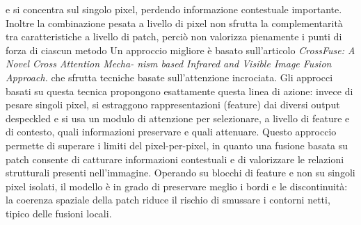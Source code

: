 e si concentra sul singolo pixel, perdendo informazione contestuale importante. 
Inoltre la combinazione pesata a livello di pixel non sfrutta la complementarità tra caratteristiche a livello di 
patch, perciò non valorizza pienamente i punti di forza di ciascun metodo
Un approccio migliore è basato sull'articolo 
\textit{CrossFuse: A Novel Cross Attention Mecha-
nism based Infrared and Visible Image Fusion Approach.} \cite{li2024crossfuse} che sfrutta tecniche basate sull'attenzione 
incrociata. Gli approcci basati su questa tecnica propongono esattamente questa linea di azione: 
invece di pesare singoli pixel, si estraggono rappresentazioni (feature) dai diversi output despeckled e si usa un modulo 
di attenzione per selezionare, a livello di feature e di contesto, quali informazioni preservare e quali attenuare. 
Questo approccio permette di superare i limiti del pixel-per-pixel, in quanto una fusione basata su patch consente 
di catturare informazioni contestuali e di valorizzare le relazioni strutturali presenti nell’immagine. Operando 
su blocchi di feature e non su singoli pixel isolati, il modello è in grado di preservare meglio i bordi e le 
discontinuità: la coerenza spaziale della patch riduce il rischio di smussare i contorni netti, tipico delle 
fusioni locali.